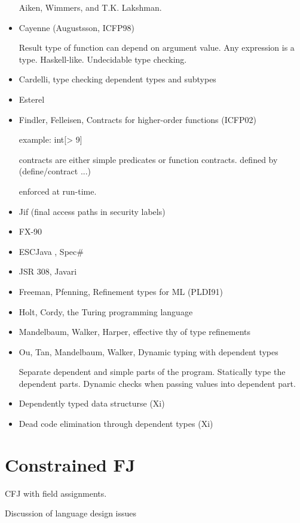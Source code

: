 \documentclass[nocopyrightspace,preprint,9pt]{sigplanconf}
\begin{document}
\begin{itemize}
Aiken, Wimmers, and T.K. Lakshman.

\item Cayenne (Augustsson, ICFP98)

Result type of function can depend on argument value.
Any expression is a type.
Haskell-like.
Undecidable type checking.

\item Cardelli, type checking dependent types and subtypes

\item Esterel

\item Findler, Felleisen, Contracts for higher-order functions (ICFP02)

example: int[> 9]

contracts are either simple predicates or function contracts.
defined by (define/contract ...)

enforced at run-time.

\item Jif (final access paths in security labels)
\item FX-90
\item ESCJava \cite{esc-java}, Spec\#
\item JSR 308, Javari
\item Freeman, Pfenning, Refinement types for ML (PLDI91)
\item Holt, Cordy, the Turing programming language
\item Mandelbaum, Walker, Harper, effective thy of type refinements
\item Ou, Tan, Mandelbaum, Walker, Dynamic typing with dependent types

Separate dependent and simple parts of the program.
Statically type the dependent parts.
Dynamic checks when passing values into dependent part.

\item Dependently typed data structurse (Xi)
\item Dead code elimination through dependent types (Xi)
\end{itemize}

\section{Constrained FJ}
\label{sec:lang}


CFJ with field assignments.

Discussion of language design issues
\end{document}
